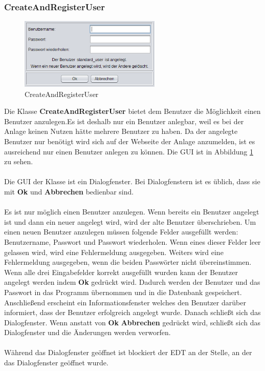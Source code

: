 \subsubsection{CreateAndRegisterUser}
\begin{figure}
\vspace{-20pt}
  \begin{center}
    \includegraphics[width=0.60\textwidth]{Bilder/GUI/CreateUser}
  \end{center}
  \caption{CreateAndRegisterUser}
  \label{CreateAndRegisterUser}
  \vspace{0pt}
\end{figure}
Die Klasse \textbf{CreateAndRegisterUser} bietet dem Benutzer die Möglichkeit einen Benutzer anzulegen.Es ist deshalb nur ein Benutzer anlegbar, weil es bei der Anlage keinen Nutzen hätte mehrere Benutzer zu haben. Da der angelegte Benutzer nur benötigt wird sich auf der Webseite der Anlage anzumelden, ist es ausreichend nur einen Benutzer anlegen zu können. Die \ac{GUI} ist in Abbildung \ref{CreateAndRegisterUser} zu sehen.
\\ \\ Die \ac{GUI} der Klasse ist ein Dialogfenster. Bei Dialogfenstern ist es üblich, dass sie mit \textbf{Ok} und \textbf{Abbrechen} bedienbar sind.
\\ \\ Es ist nur möglich einen Benutzer anzulegen. Wenn bereits ein Benutzer angelegt ist und dann ein neuer angelegt wird, wird der alte Benutzer überschrieben. Um einen neuen Benutzer anzulegen müssen folgende Felder ausgefüllt werden: Benutzername, Passwort und Passwort wiederholen. Wenn eines dieser Felder leer gelassen wird, wird eine Fehlermeldung ausgegeben. Weiters wird eine Fehlermeldung ausgegeben, wenn die beiden Passwörter nicht übereinstimmen. Wenn alle drei Eingabefelder korrekt ausgefüllt wurden kann der Benutzer angelegt werden indem \textbf{Ok} gedrückt wird. Dadurch werden der Benutzer und das Passwort in das Programm übernommen und in die Datenbank gespeichert. Anschließend erscheint ein Informationsfenster welches den Benutzer darüber informiert, dass der Benutzer erfolgreich angelegt wurde. Danach schließt sich das Dialogfenster. Wenn anstatt von \textbf{Ok} \textbf{Abbrechen} gedrückt wird, schließt sich das Dialogfenster und die Änderungen werden verworfen.
\\ \\ Während das Dialogfenster geöffnet ist blockiert der \ac{EDT} an der Stelle, an der das Dialogfenster geöffnet wurde.

